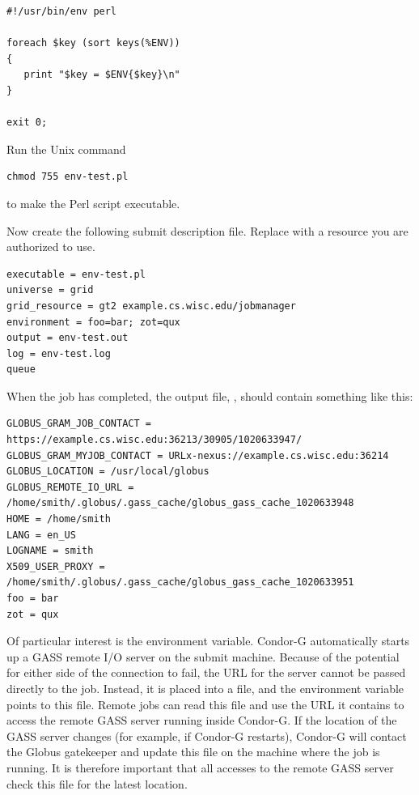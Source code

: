 \begin{verbatim}
#!/usr/bin/env perl

foreach $key (sort keys(%ENV))
{
   print "$key = $ENV{$key}\n"
}

exit 0;
\end{verbatim}

Run the Unix command
\begin{verbatim}
chmod 755 env-test.pl
\end{verbatim}
to make the Perl script executable.

Now create the following submit description file.
Replace  with a resource
you are authorized to use.

\footnotesize
\begin{verbatim}
executable = env-test.pl
universe = grid
grid_resource = gt2 example.cs.wisc.edu/jobmanager
environment = foo=bar; zot=qux
output = env-test.out
log = env-test.log
queue
\end{verbatim}
\normalsize

When the job has completed, the output file, ,
should contain something like this:

\footnotesize
\begin{verbatim}
GLOBUS_GRAM_JOB_CONTACT = https://example.cs.wisc.edu:36213/30905/1020633947/
GLOBUS_GRAM_MYJOB_CONTACT = URLx-nexus://example.cs.wisc.edu:36214
GLOBUS_LOCATION = /usr/local/globus
GLOBUS_REMOTE_IO_URL = /home/smith/.globus/.gass_cache/globus_gass_cache_1020633948
HOME = /home/smith
LANG = en_US
LOGNAME = smith
X509_USER_PROXY = /home/smith/.globus/.gass_cache/globus_gass_cache_1020633951
foo = bar
zot = qux
\end{verbatim}
\normalsize


Of particular interest is the 
environment variable.
Condor-G automatically starts up a GASS remote I/O
server on the submit machine.
Because of the potential for either side of the connection to fail,
the URL for the server cannot be passed directly to the job.
Instead, it is placed into a file, and the 
environment variable points to this file.
Remote jobs can read this file and use the URL it contains
to access the remote GASS server running inside Condor-G.
If the location
of the GASS server changes (for example, if Condor-G restarts),
Condor-G will contact the Globus gatekeeper and update this file on
the machine where the job is running.
It is therefore important that all accesses to
the remote GASS server check this file for the latest location.

